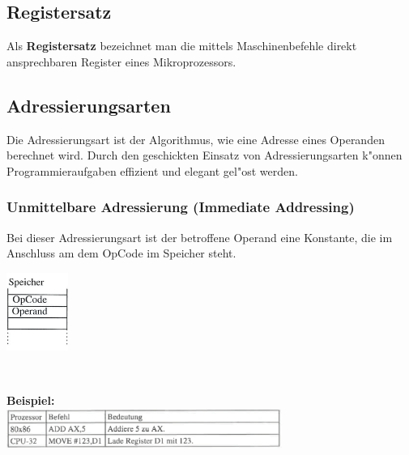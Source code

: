 \subsection{Registersatz}
Als \textbf{Registersatz} bezeichnet man die mittels Maschinenbefehle direkt ansprechbaren Register eines Mikroprozessors.

\subsection{Adressierungsarten}
Die Adressierungsart ist der Algorithmus, wie eine Adresse eines Operanden berechnet wird. Durch den geschickten Einsatz von Adressierungsarten k"onnen Programmieraufgaben effizient und elegant gel"ost werden.

\subsubsection{Unmittelbare Adressierung (Immediate Addressing)}
Bei dieser Adressierungsart ist der betroffene Operand eine Konstante, die im Anschluss am dem OpCode im Speicher steht.
\begin{minipage}{2cm}
	\includegraphics[width=2cm]{pics/Unmittelbare-Adressierung}
\end{minipage}
%
\begin{minipage}{0.5cm}
	\ \
\end{minipage}
%
\begin{minipage}{9cm}
	\textbf{Beispiel:}\\
	\includegraphics[width=9cm]{pics/UnmittelbareAdressierung-Bsp}
\end{minipage}

